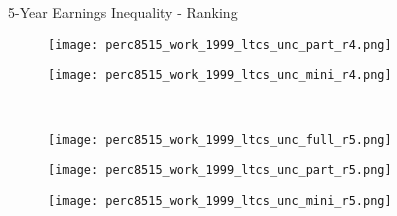 \documentclass[hyperref={bookmarks=false}]{beamer}
\begin{document}
\begin{appendix}
\begin{frame}{5-Year Earnings Inequality - Ranking}
\begin{figure}[!t]
\begin{minipage}[b]{0.15\textwidth}{}
\centering
\texttt{[image: perc8515\_work\_1999\_ltcs\_unc\_part\_r4.png]}
\end{minipage}
\begin{minipage}[b]{0.15\textwidth}{}
\centering
\texttt{[image: perc8515\_work\_1999\_ltcs\_unc\_mini\_r4.png]}
\end{minipage}\\
\begin{minipage}[b]{0.15\textwidth}{}
\centering
\texttt{[image: perc8515\_work\_1999\_ltcs\_unc\_full\_r5.png]}
\end{minipage}
\begin{minipage}[b]{0.15\textwidth}{}
\centering
\texttt{[image: perc8515\_work\_1999\_ltcs\_unc\_part\_r5.png]}
\end{minipage}
\begin{minipage}[b]{0.15\textwidth}{}
\centering
\texttt{[image: perc8515\_work\_1999\_ltcs\_unc\_mini\_r5.png]}
\end{minipage}\\
\end{figure}
\end{frame}


\end{appendix}
\end{document}
